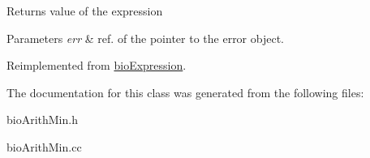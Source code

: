 \begin{DoxyReturn}{Returns}
value of the expression 
\end{DoxyReturn}

\begin{DoxyParams}{Parameters}
{\em err} & ref. of the pointer to the error object. \\
\hline
\end{DoxyParams}


Reimplemented from \hyperlink{classbio_expression_af58662a5d4d456f15bc4f2c9bd4f8a5b}{bio\+Expression}.



The documentation for this class was generated from the following files\+:\begin{DoxyCompactItemize}
\item 
bio\+Arith\+Min.\+h\item 
bio\+Arith\+Min.\+cc\end{DoxyCompactItemize}
